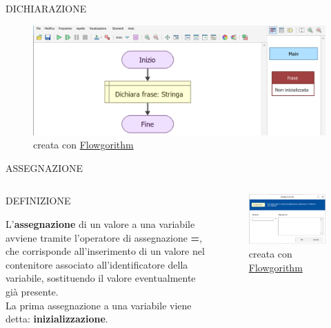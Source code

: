 \documentclass[aspectratio=1610, handout]{beamer}
\begin{document}
\begin{frame}{DICHIARAZIONE}
    \begin{figure}
        \includegraphics[width=\linewidth]{img/dichiarazione2.png}
        \caption{{creata con \href{http://www.flowgorithm.org/}{Flowgorithm}}}
    \end{figure}
\end{frame}

\begin{frame}{ASSEGNAZIONE}
    \begin{columns}
            \begin{alertblock}{DEFINIZIONE}
                \begin{minipage}{0.96\linewidth}
                    \justifying
                    L'\textbf{assegnazione} di un valore a una variabile avviene tramite 
                    l'operatore di assegnazione \textbf{=}, che corrisponde all'inserimento 
                    di un valore nel contenitore associato all'identificatore della variabile, 
                    sostituendo il valore eventualmente già presente.\\
                    La prima assegnazione a una variabile viene detta: \textbf{inizializzazione}.
                \end{minipage}
            \end{alertblock}
            \begin{figure}
                \includegraphics[width=\linewidth]{img/assegnazione.png}
                \caption{{creata con \href{http://www.flowgorithm.org/}{Flowgorithm}}}
            \end{figure}
    \end{columns}
\end{frame}
\end{document}
